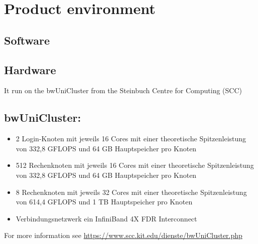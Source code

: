 \section{Product environment}
	\subsection{Software}
	\subsection{Hardware}
	It run on the bwUniCluster from the Steinbuch Centre for Computing (SCC)
	\subsection{bwUniCluster:}
	\begin{itemize}
		\item{2 Login-Knoten mit jeweils 16 Cores mit einer theoretische Spitzenleistung von 332,8 GFLOPS und 64 GB Hauptspeicher pro Knoten}
		\item{512 Rechenknoten mit jeweils 16 Cores mit einer theoretische Spitzenleistung von 332,8 GFLOPS und 64 GB Hauptspeicher pro Knoten}
		\item{8 Rechenknoten mit jeweils 32 Cores mit einer theoretische Spitzenleistung von 614,4 GFLOPS und 1 TB Hauptspeicher pro Knoten}
		\item{Verbindungsnetzwerk ein InfiniBand 4X FDR Interconnect}
	\end{itemize}
	For more information see \href{https://www.scc.kit.edu/dienste/bwUniCluster.php}{https://www.scc.kit.edu/dienste/bwUniCluster.php}
    
 